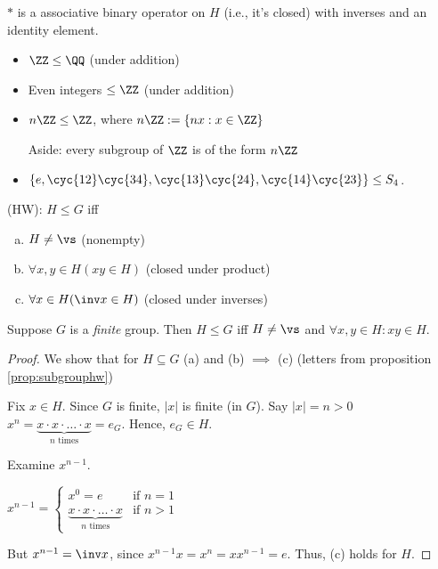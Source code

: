 \documentclass[notes.tex]{subfiles}
\begin{document}
$*$ is a associative binary operator on $H$ (i.e., it's closed) with inverses and an identity element.

\begin{eg}\leavevmode
	\begin{itemize}
		\item $\ZZ\le\QQ$ (under addition)
		\item Even integers $\le \ZZ$ (under addition)
		\item $n\ZZ \le\ZZ$, where $n\ZZ := \{nx : x\in \ZZ\}$

		Aside: every subgroup of $\ZZ$ is of the form $n\ZZ$
		\item $\{e, \cyc{1 2}\cyc{3 4}, \cyc{1 3}\cyc{2 4}, \cyc{1 4}\cyc{2 3}\} \le S_4$.
	\end{itemize}
\end{eg}


\begin{proposition}
	\label{prop:subgrouphw}
	(HW): $H\le G$ iff
	\begin{enumerate}[(a)]
		\item $H\ne\vs$ (nonempty)
		\item $\forall x,y\in H (xy\in H)$ (closed under product)
		\item $\forall x\in H (\inv x\in H)$  (closed under inverses)
	\end{enumerate}
\end{proposition}

\begin{proposition}
	Suppose $G$ is a \emph{finite} group.
	Then $H \le G$ iff $H \ne\vs$ and $\forall x,y\in H: xy\in H$.
\end{proposition}

\begin{proof}
	We show that for $H\subseteq G$
	(a) and (b) $\implies$ (c) (letters from proposition \eqref{prop:subgrouphw})

	Fix $x\in H$.
	Since $G$ is finite, $|x|$ is finite (in $G$). Say $|x| = n > 0$
	$x^n = \underbrace{x\cdot x\cdot \ldots \cdot x}_{n\text{ times}} = e_G.$ Hence, $e_G\in H$.

	Examine $x^{n-1}$.

	$x^{n-1} = \begin{cases}
		x^0 = e & \text{if } n = 1\\
		\underbrace{x\cdot x\cdot\ldots\cdot x}_{n\text{ times}} &\text{if } n > 1
	\end{cases}$

	But $x^{n-1} = \inv x$, since $x^{n-1}x = x^n = xx^{n-1} = e$.
	Thus, (c) holds for $H$.
\end{proof}
\end{document}
